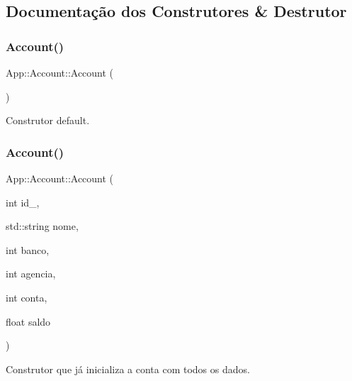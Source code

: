\subsection{Documentação dos Construtores \& Destrutor}
\mbox{\label{structApp_1_1Account_aa14ee6213993d18e3c29be2cfe7648a9}} 
\subsubsection{\texorpdfstring{Account()}{Account()}\hspace{0.1cm}{\footnotesize\ttfamily [1/2]}}
{\footnotesize\ttfamily App\+::\+Account\+::\+Account (\begin{DoxyParamCaption}{ }\end{DoxyParamCaption})\hspace{0.3cm}{\ttfamily [inline]}}



Construtor default. 

\mbox{\label{structApp_1_1Account_a3f78b7dfeb49586fa19a00a29f1cbd5a}} 
\subsubsection{\texorpdfstring{Account()}{Account()}\hspace{0.1cm}{\footnotesize\ttfamily [2/2]}}
{\footnotesize\ttfamily App\+::\+Account\+::\+Account (\begin{DoxyParamCaption}\item[{int}]{id\+\_\+,  }\item[{std\+::string}]{nome,  }\item[{int}]{banco,  }\item[{int}]{agencia,  }\item[{int}]{conta,  }\item[{float}]{saldo }\end{DoxyParamCaption})\hspace{0.3cm}{\ttfamily [inline]}}



Construtor que já inicializa a conta com todos os dados. 



